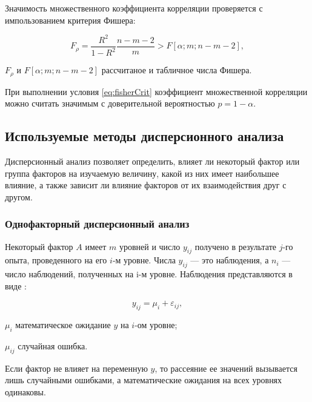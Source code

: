 Значимость множественного коэффициента корреляции проверяется с импользованием критерия Фишера:

\begin{equation}
\label{eq:fisherCrit}
F_\rho = \frac{R^2}{1-R^2} \frac{n - m - 2}{m} > F\left[{\alpha;m;n-m-2}\right],
\end{equation}
\begin{eqexpl}[60mm]
\item{$F_\rho$ и $F\left[\alpha;m;n-m-2\right]$} рассчитаное и табличное числа Фишера.
\end{eqexpl}

При выполнении условия \eqref{eq:fisherCrit} коэффициент множественной корреляции можно считать значимым с доверительной вероятностью $p = 1 - \alpha$.

\subsection{Используемые методы дисперсионного анализа}

Дисперсионный анализ позволяет определить, влияет ли некоторый фактор или группа факторов на изучаемую величину, какой из них имеет наибольшее влияние, а также зависит ли влияние факторов от их взаимодействия друг с другом. \cite{disperMethod}

\subsubsection{Однофакторный дисперсионный анализ}
Некоторый фактор $A$ имеет $m$ уровней и число $y_{ij}$ получено в результате $j$-го опыта, проведенного на его $i$-м уровне. Числа $y_{ij}$ --- это наблюдения, а $n_i$ --- число наблюдений, полученных на i-м уровне. Наблюдения представляются в виде \cite{disperMethod}:

\begin{equation}
\label{eq:watcha}
y_{ij} = \mu_i+\varepsilon_{ij},
\end{equation}
\begin{eqexpl}[15mm]
\item{$\mu_i$} математическое ожидание $y$ на $i$-ом уровне;
\item{$\mu_{ij}$} случайная ошибка.
\end{eqexpl}

Если фактор не влияет на переменную $y$, то рассеяние ее значений вызывается лишь случайными ошибками, а математические ожидания на всех уровнях одинаковы. \cite{disperMethod}

